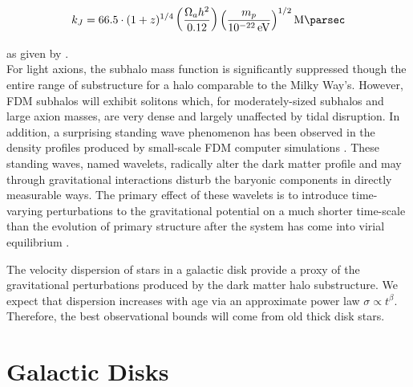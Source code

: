 \documentclass[usenatbib]{mnras}
\newcommand{\poweV}[1]{\SI{e#1}{\electronvolt}}
\begin{document}
\begin{equation}
k_J = 66.5 \cdot (1+z)^{1/4} \left( \frac{\Omega_a h^2}{0.12} \right) \left(\frac{m_p}{\poweV{-22}} \right)^{1/2} \si{\per\mega\parsec}
\end{equation}

as given by \citet{axion_cosmology}. \\ For light axions, the subhalo mass function is significantly suppressed though the entire range of substructure for a halo comparable to the Milky Way’s. However, FDM subhalos will exhibit solitons which, for moderately-sized subhalos and large axion masses, are very dense and largely unaffected by tidal disruption. In addition, a surprising standing wave phenomenon has been observed in the density profiles produced by small-scale FDM computer simulations \citep{cold_and_fuzzy}. These standing waves, named wavelets, radically alter the dark matter profile and may through gravitational interactions disturb the baryonic components in directly measurable ways. The primary effect of these wavelets is to introduce time-varying perturbations to the gravitational potential on a much shorter time-scale than the evolution of primary structure after the system has come into virial equilibrium \cite{Schrodinger-Poisson}. 
\par
	The velocity dispersion of stars in a galactic disk provide a proxy of the gravitational perturbations produced by the dark matter halo substructure. We expect that dispersion increases with age via an approximate power law $\sigma \propto t^\beta$. Therefore, the best observational bounds will come from old thick disk stars.  

\section{Galactic Disks}
\end{document}
